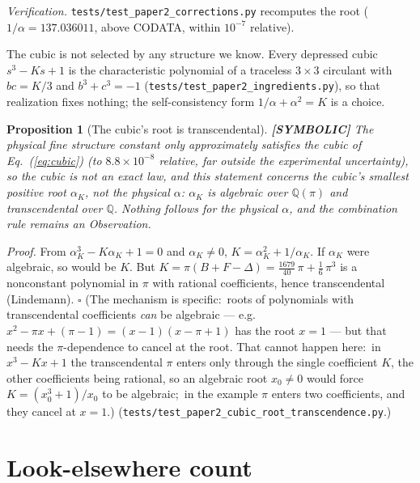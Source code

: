 \documentclass[aps,prl,twocolumn,superscriptaddress]{revtex4-2}
\newtheorem{proposition}{Proposition}
\begin{document}
\emph{Verification.} \texttt{tests/test\_paper2\_corrections.py}
recomputes the root ($1/\alpha = 137.036011$, above CODATA, within
$10^{-7}$ relative).

The cubic is not selected by any structure we know. Every depressed
cubic $s^3 - Ks + 1$ is the characteristic polynomial of a traceless
$3\times3$ circulant with $bc = K/3$ and $b^3 + c^3 = -1$
(\texttt{tests/test\_paper2\_ingredients.py}), so that realization fixes
nothing; the self-consistency form $1/\alpha + \alpha^2 = K$ is a
choice.

\begin{proposition}[The cubic's root is transcendental]
\textbf{[SYMBOLIC]} The physical fine structure constant only
\emph{approximately} satisfies the cubic of Eq.~(\ref{eq:cubic}) (to
$8.8\times10^{-8}$ relative, far outside the experimental uncertainty),
so the cubic is not an exact law, and this statement concerns the
cubic's smallest positive root $\alpha_K$, not the physical $\alpha$:
$\alpha_K$ is algebraic over $\mathbb{Q}(\pi)$ and transcendental over
$\mathbb{Q}$. Nothing follows for the physical $\alpha$, and the
combination rule remains an Observation.
\end{proposition}
\emph{Proof.} From $\alpha_K^3 - K\alpha_K + 1 = 0$ and $\alpha_K\neq0$,
$K = \alpha_K^2 + 1/\alpha_K$. If $\alpha_K$ were algebraic, so would
be $K$. But $K = \pi(B+F-\Delta) = \tfrac{1679}{40}\,\pi +
\tfrac{1}{6}\,\pi^{3}$ is a nonconstant polynomial in $\pi$ with
rational coefficients, hence transcendental (Lindemann). $\square$
(The mechanism is specific:\ roots of polynomials with transcendental
coefficients \textit{can} be algebraic --- e.g.\ $x^2 - \pi x + (\pi-1)
= (x-1)(x-\pi+1)$ has the root $x = 1$ --- but that needs the
$\pi$-dependence to cancel at the root.  That cannot happen here:\ in
$x^3 - Kx + 1$ the transcendental $\pi$ enters only through the single
coefficient $K$, the other coefficients being rational, so an algebraic
root $x_0 \neq 0$ would force $K = (x_0^3 + 1)/x_0$ to be algebraic;\ in
the example $\pi$ enters two coefficients, and they cancel at $x = 1$.)
(\texttt{tests/test\_paper2\_cubic\_root\_transcendence.py}.)


\section{Look-elsewhere count}\label{sec:statistical}
\end{document}
